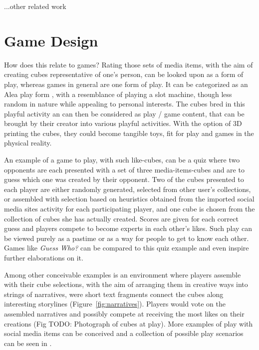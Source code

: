 \documentclass[]{article}
\begin{document}
...other related work




\section{Game Design}
\label{sec:GameDesign}

How does this relate to games?  Rating those sets of media items, with the aim of creating cubes representative of one's person, can be looked upon as a form of play, whereas games in general are one form of play.  It can be categorized as an Alea play form \cite{caillois2001man}, with a resemblance of playing a slot machine, though less random in nature while appealing to personal interests.  The cubes bred in this playful activity an can then be considered as play / game content, that can be brought by their creator into various playful activities.  With the option of 3D printing the cubes, they could become tangible toys, fit for play and games in the physical reality.

An example of a game to play, with such like-cubes, can be a quiz where two opponents are each presented with a set of three media-items-cubes and are to guess which one was created by their opponent.  Two of the cubes presented to each player are either randomly generated, selected from other user's collections, or assembled with selection based on heuristics obtained from the imported social media sites activity for each participating player, and one cube is chosen from the collection of cubes she has actually created.  Scores are given for each correct guess and players compete to become experts in each other's likes.  Such play can be viewed purely as a pastime or as a way for people to get to know each other.  Games like \textit{Guess Who?}\cite{GuessWho} can be compared to this quiz example and even inspire further elaborations on it.

Among other conceivable examples is an environment where players assemble with their cube selections, with the aim of arranging them in creative ways into strings of narratives, were short text fragments connect the cubes along interesting storylines (Figure~\ref{fig:narratives}).  Players would vote on the assembled narratives and possibly compete at receiving the most likes on their creations (Fig TODO: Photograph of cubes at play).  More examples of play with social media items can be conceived and a collection of possible play scenarios can be seen in \cite{GoLplay}.
\end{document}
